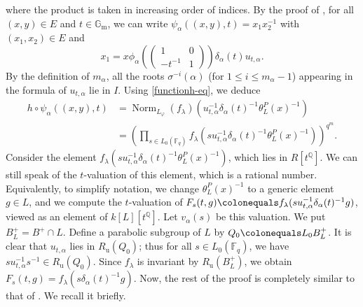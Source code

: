 \documentclass[11pt]{amsart}
\numberwithin{equation}{section}
\theoremstyle{definition}
\theoremstyle{remark}
\newcommand{\FF}{\mathbb{F}}
\newcommand{\GG}{\mathbb{G}}
\newcommand{\QQ}{\mathbb{Q}}
\DeclareMathOperator{\Norm}{Norm}
\begin{document}
where the product is taken in increasing order of indices. By the proof of \cite[Proposition 3.1.4]{Imai-Koskivirta-vector-bundles}, for all $(x,y)\in E$ and $t\in \GG_{\mathrm{m}}$, we can write $\psi_\alpha((x,y),t)=x_1x_2^{-1}$ with $(x_1,x_2)\in E$ and
\begin{equation}
    x_1=x\phi_{\alpha} \left(\begin{pmatrix}
1&0\\-t^{-1}&1
\end{pmatrix} \right) \delta_{\alpha}(t) 
u_{t,\alpha}.
\end{equation}
By the definition of $m_\alpha$, all the roots $\sigma^{-i}(\alpha)$ (for $1\leq i\leq m_\alpha-1$) appearing in the formula of $u_{t,\alpha}$ lie in $I$. Using \eqref{functionh-eq}, we deduce 
\begin{align}
h\circ \psi_\alpha((x,y),t)&=\Norm_{L_\varphi}(f_\lambda)\left(u_{t,\alpha}^{-1}\delta_\alpha(t)^{-1}\theta_L^P(x)^{-1}\right) \\
&=\left(\prod_{s\in L_0(\FF_q)} f_\lambda\left(su_{t,\alpha}^{-1}\delta_\alpha(t)^{-1}\theta_L^P(x)^{-1}\right) \right)^{q^m}.
\end{align}
Consider the element $f_\lambda(su_{t,\alpha}^{-1}\delta_\alpha(t)^{-1}\theta_L^P(x)^{-1})$, which lies in $R[t^{\QQ}]$. We can still speak of the $t$-valuation of this element, which is a rational number. Equivalently, to simplify notation, we change $\theta_L^P(x)^{-1}$ to a generic element $g\in L$, and we compute the $t$-valuation of $F_s(t,g)\colonequals f_\lambda(su_{t,\alpha}^{-1}\delta_\alpha(t)^{-1}g)$, viewed as an element of $k[L][t^\QQ]$. Let $v_\alpha(s)$ be this valuation. 
We put $B^+_L=B^+ \cap L$. 
Define a parabolic subgroup of $L$ by $Q_0\colonequals L_0 B^+_L$. It is clear that $u_{t,\alpha}$ lies in $R_{\mathrm{u}}(Q_0)$; thus for all $s\in L_0(\FF_q)$, we have $su_{t,\alpha}^{-1}s^{-1}\in R_{\mathrm{u}}(Q_0)$. Since $f_\lambda$ is invariant by $R_{\mathrm{u}}(B^+_L)$, we obtain 
$F_s(t,g)=f_\lambda(s\delta_\alpha(t)^{-1}g)$. Now, the rest of the proof is completely similar to that of \cite[Theorem 3.5.3]{Koskivirta-automforms-GZip}. We recall it briefly.
\end{document}
